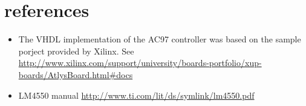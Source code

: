 \newpage
\section{references}
\begin{itemize}
\item The VHDL implementation of the AC97 controller was based on the sample porject provided by Xilinx. See \url{http://www.xilinx.com/support/university/boards-portfolio/xup-boards/AtlysBoard.html#docs} 
\item LM4550 manual \url{http://www.ti.com/lit/ds/symlink/lm4550.pdf}
\end{itemize}